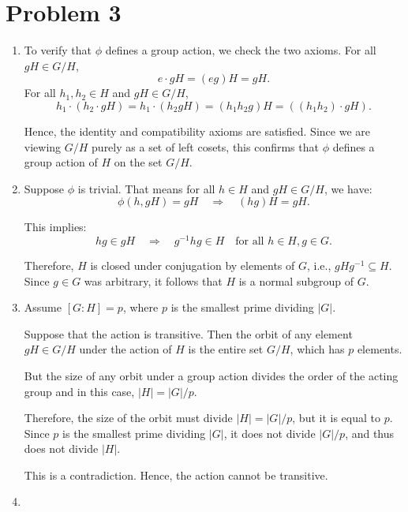 \documentclass[12pt]{article}
\begin{document}
\section*{Problem 3}

\begin{enumerate}[label=(\arabic*)] 

\item To verify that \( \phi \) defines a group action, we check the two axioms. For all \( gH \in G/H \), 
\[e \cdot gH = (eg)H = gH.\]
For all \( h_1, h_2 \in H \) and \( gH \in G/H \), 
\[h_1 \cdot (h_2 \cdot gH) = h_1 \cdot (h_2 g H) = (h_1 h_2 g)H = ((h_1 h_2) \cdot gH).\]

Hence, the identity and compatibility axioms are satisfied. Since we are viewing \( G/H \) purely as a set of left cosets, this confirms that \( \phi \) defines a group action of \( H \) on the set \( G/H \).

\item

Suppose $\phi$ is trivial. That means for all \( h \in H \) and \( gH \in G/H \), we have:
\[
\phi(h, gH) = gH \quad \Rightarrow \quad (hg)H = gH.
\]

This implies:
\[
hg \in gH \quad \Rightarrow \quad g^{-1} h g \in H \quad \text{for all } h \in H, g \in G.
\]

Therefore, \( H \) is closed under conjugation by elements of \( G \), i.e., \( gHg^{-1} \subseteq H \). 
Since \( g \in G \) was arbitrary, it follows that \(H\) is a normal subgroup of \(G\).

\item

Assume \( [G : H] = p \), where \( p \) is the smallest prime dividing \( |G| \).

Suppose that the action is transitive. Then the orbit of any element \( gH \in G/H \) under the action of \( H \) is the entire set \( G/H \), which has \( p \) elements.

But the size of any orbit under a group action divides the order of the acting group and in this case, \( |H| = |G|/p \).

Therefore, the size of the orbit must divide \( |H| = |G|/p \), but it is equal to \( p \). Since \( p \) is the smallest prime dividing \( |G| \), it does not divide \( |G|/p \), and thus does not divide \( |H| \).

This is a contradiction. Hence, the action cannot be transitive.

\item


\end{enumerate}
\end{document}
